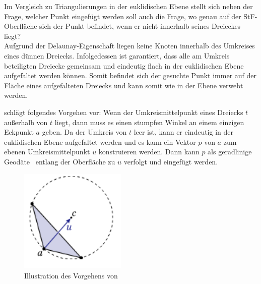 Im Vergleich zu Triangulierungen in der euklidischen Ebene stellt sich neben der Frage, welcher Punkt eingefügt werden soll auch die Frage, wo genau auf der StF-Oberfläche sich der Punkt befindet, wenn er nicht innerhalb seines Dreieckes liegt? \\

Aufgrund der Delaunay-Eigenschaft liegen keine Knoten innerhalb des Umkreises eines dünnen Dreiecks. Infolgedessen ist  garantiert, dass alle am Umkreis beteiligten Dreiecke gemeinsam und eindeutig flach in der euklidischen Ebene aufgefaltet werden können. Somit befindet sich der gesuchte Punkt immer auf der Fläche eines aufgefalteten Dreiecks und kann somit wie in der Ebene verwebt werden. 


\citet{Sharp:2019:NIT} schlägt folgendes Vorgehen vor:
Wenn der Umkreismittelpunkt eines Dreiecks $t$ außerhalb von
$t$ liegt, dann muss es einen stumpfen Winkel an einem einzigen
Eckpunkt $a$ geben. Da der Umkreis von $t$ leer ist, kann er
eindeutig in der euklidischen Ebene aufgefaltet werden  und es kann ein Vektor $p$ von $a$ zum ebenen Umkreismittelpunkt $u$ konstruieren werden. Dann kann $p$ als geradlinige Geodäte~\cite{Polthier:2006:SIGGRAPH} entlang der Oberfläche zu $u$ verfolgt und eingefügt werden.

 \begin{figure}[h]
    \centering
    \includegraphics[width=2in]{images/auffaltung_punkteinfuegen.png}
    \caption{Illustration des Vorgehens von~\citeauthor{Sharp:2019:NIT} \cite{Sharp:2019:NIT} }%
    \label{fig:auffaltung_Punkt_einfügen}
\end{figure}
\newpage
